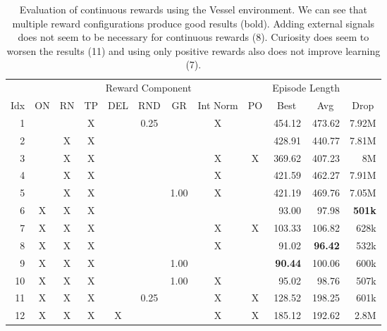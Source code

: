 \begin{table}[htp]
    \begin{center}
        \begin{tabular}{rccccccccrrr}
            \toprule
             & \multicolumn{8}{c}{Reward Component} & \multicolumn{2}{c}{Episode Length} & \\
            \cmidrule(lr){2-9}\cmidrule(lr){10-11}
            \multicolumn{1}{c}{Idx} & \multicolumn{1}{c}{ON} & \multicolumn{1}{c}{RN} & \multicolumn{1}{c}{TP} & \multicolumn{1}{c}{DEL} & \multicolumn{1}{c}{RND} & \multicolumn{1}{c}{GR} & \multicolumn{1}{c}{Int Norm} & \multicolumn{1}{c}{PO} & \multicolumn{1}{c}{Best} & \multicolumn{1}{c}{Avg} & \multicolumn{1}{c}{Drop}\\
            \midrule
            1 &  &  & X &  & 0.25 &  & X &  & 454.12 & 473.62 & 7.92M \\
            2 &  & X & X &  &  &  &  &  & 428.91 & 440.77 & 7.81M \\
            3 &  & X & X &  &  &  & X & X & 369.62 & 407.23 & 8M \\
            4 &  & X & X &  &  &  & X &  & 421.59 & 462.27 & 7.91M \\
            5 &  & X & X &  &  & 1.00 & X &  & 421.19 & 469.76 & 7.05M \\
            6 & X & X & X &  &  &  &  &  & 93.00 & 97.98 & \textbf{501k} \\
            7 & X & X & X &  &  &  & X & X & 103.33 & 106.82 & 628k \\
            8 & X & X & X &  &  &  & X &  & 91.02 & \textbf{96.42} & 532k \\
            9 & X & X & X &  &  & 1.00 &  &  & \textbf{90.44} & 100.06 & 600k \\
            10 & X & X & X &  &  & 1.00 & X &  & 95.02 & 98.76 & 507k \\
            11 & X & X & X &  & 0.25 &  & X & X & 128.52 & 198.25 & 601k \\
            12 & X & X & X & X &  &  & X & X & 185.12 & 192.62 & 2.8M \\
            \bottomrule
        \end{tabular}
    \end{center}
    \caption[Evaluation of Continuous Rewards using the Vessel Environment]{Evaluation of continuous rewards using the Vessel environment. We can see that multiple reward configurations produce good results (bold). Adding external signals does not seem to be necessary for continuous rewards (8). Curiosity does seem to worsen the results (11) and using only positive rewards also does not improve learning (7).} \label{tab:VesselMaze02/Reward/Continuous}
\end{table}

